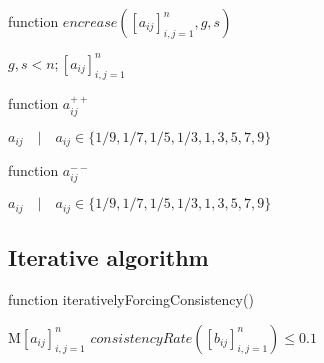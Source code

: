 \documentclass[authoryear,manuscript,12pt]{elsarticle}
\begin{document}
\begin{algorithm}
\caption{function $encrease([a_{ij}]_{i,j=1}^{n}, g, s)$}\label{alg:CA}
\begin{algorithmic}
\Require $g,s < n; [a_{ij}]_{i,j=1}^{n}$
		\EndIf
	\Else
	\EndIf
\EndWhile
{}
\end{algorithmic}
\end{algorithm}

\begin{algorithm}
\caption{function $a_{ij}^{++}$}\label{alg:CA}
\begin{algorithmic}
\Require $a_{ij} \quad | \quad a_{ij} \in \{1/9, 1/7, 1/5, 1/3, 1, 3, 5, 7, 9\}$
	\EndIf
{}
\end{algorithmic}
\end{algorithm}

\begin{algorithm}
\caption{function $a_{ij}^{--}$}\label{alg:CA}
\begin{algorithmic}
\Require $a_{ij} \quad | \quad a_{ij} \in \{1/9, 1/7, 1/5, 1/3, 1, 3, 5, 7, 9\}$
	\EndIf
{}
\end{algorithmic}
\end{algorithm}

\subsection{Iterative algorithm}

\begin{algorithm}
\caption{function iterativelyForcingConsistency()}\label{alg:CA}
\begin{algorithmic}
\Require $\textrm{M}[a_{ij}]_{i,j=1}^{n}$
\Ensure $consistencyRate([b_{ij}]_{i,j=1}^{n}) \leq 0.1$

\end{algorithmic}
\end{algorithm}
\end{document}
